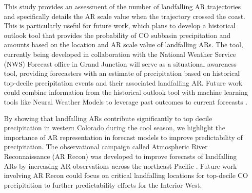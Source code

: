 \documentclass[draft]{agujournal2019}
\begin{document}
This study provides an assessment of the number of landfalling AR trajectories and specifically details the AR scale \cite{MartinRalph2019} value when the trajectory crossed the coast. This is particularly useful for future work, which plans to develop a historical outlook tool that provides the probability of CO subbasin precipitation and amounts based on the location and AR scale value of landfalling ARs. The tool, currently being developed in collaboration with the National Weather Service (NWS) Forecast office in Grand Junction will serve as a situational awareness tool, providing forecasters with an estimate of precipitation based on historical top-decile precipitation events and their associated landfalling AR. Future work could combine information from the historical outlook tool with machine learning tools like Neural Weather Models to leverage past outcomes to current forecasts \cite{Bano-Medina2025TowardForecasts}. 

By showing that landfalling ARs contribute significantly to top decile precipitation in western Colorado during the cool season, we highlight the importance of AR representation in forecast models to improve predictability of precipitation. The observational campaign called Atmospheric River Reconnaissance (AR Recon) was developed to improve forecasts of landfalling ARs by increasing AR observations across the northeast Pacific \cite{Lavers2024AdvancingProgram, Ralph2020WestReconnaissance}. Future work involving AR Recon could focus on critical landfalling locations for top-decile CO precipitation to further predictability efforts for the Interior West. 






\end{document}
